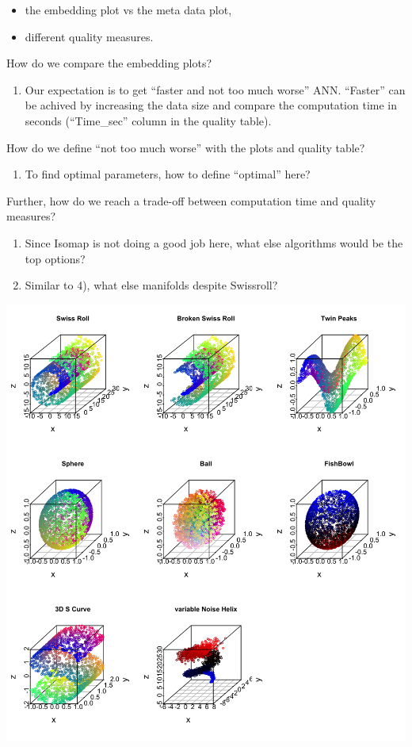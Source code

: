 \documentclass[11pt,a4paper,]{article}
\providecommand{\tightlist}{%
  \setlength{\itemsep}{0pt}\setlength{\parskip}{0pt}}
\begin{document}
\begin{itemize}
\item
  the embedding plot vs the meta data plot,
\item
  different quality measures.
\end{itemize}

How do we compare the embedding plots?

\begin{enumerate}
\def\labelenumi{\arabic{enumi})}
\setcounter{enumi}{1}
\tightlist
\item
  Our expectation is to get ``faster and not too much worse'' ANN. ``Faster'' can be achived by increasing the data size and compare the computation time in seconds (``Time\_sec'' column in the quality table).
\end{enumerate}

How do we define ``not too much worse'' with the plots and quality table?

\begin{enumerate}
\def\labelenumi{\arabic{enumi})}
\setcounter{enumi}{2}
\tightlist
\item
  To find optimal parameters, how to define ``optimal'' here?
\end{enumerate}

Further, how do we reach a trade-off between computation time and quality measures?

\begin{enumerate}
\def\labelenumi{\arabic{enumi})}
\setcounter{enumi}{3}
\item
  Since Isomap is not doing a good job here, what else algorithms would be the top options?
\item
  Similar to 4), what else manifolds despite Swissroll?
\end{enumerate}

\begin{center}\includegraphics[width=0.9\linewidth]{figures/manifolds} \end{center}
\newpage

\setlength{\parindent}{-0.2in}
\setlength{\leftskip}{0.2in}
\setlength{\parskip}{8pt}
\vspace*{-0.2in}

\noindent

\printbibliography
\end{document}
